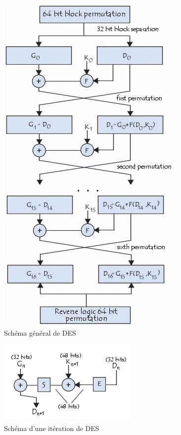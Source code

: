 \documentclass[a4paper,12pt]{article}
\begin{document}
\begin{figure}[h]
\centering
\includegraphics[scale=0.80]{./images/DES_diagram.png}
\caption{Schéma général de DES}
\label{fig:DES-diagram}
\end{figure}

\clearpage

\begin{figure}[h]
\centering
\includegraphics[scale=0.80]{./images/DES_round.png}
\caption{Schéma d'une itération de DES}
\label{fig:DES-round}
\end{figure}

\newpage
\end{document}
